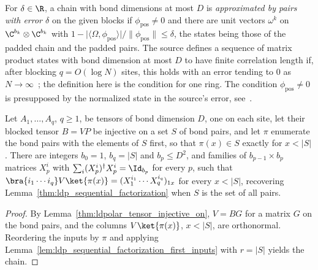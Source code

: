 \begin{definition}
    \label{def:ldp_pair_approximable}
    \leanok
    For $\delta\in\R$, a chain with bond dimensions at most $D$ is
    \emph{approximated by pairs with error $\delta$} on the given blocks if
    $\phi_{\mathrm{pos}}\neq0$ and there are unit vectors $\omega^k$ on
    $\C^{b_k}\otimes\C^{b_k}$ with
    $1-\lvert\langle\Omega,\phi_{\mathrm{pos}}\rangle\rvert
        /\lVert\phi_{\mathrm{pos}}\rVert\le\delta$, the states being those of
    the padded chain and the padded pairs. The source defines a sequence of
    matrix product states with bond dimension at most $D$ to have finite
    correlation length if, after blocking $q=O(\log N)$ sites, this holds with
    an error tending to $0$ as $N\to\infty$~\cite[paragraph ``Inhomogeneous
        short-range correlated MPS'']{Malz2024Preparation}; the definition here
    is the condition for one ring. The condition $\phi_{\mathrm{pos}}\neq0$ is
    presupposed by the normalized state in the source's error,
    see~\cite{gap:mswc24_inhomogeneous_scope}.
\end{definition}

\begin{lemma}
    \label{thm:ldp_sequential_factorization_on}
    \leanok
    Let $A_1,\dots,A_q$, $q\ge1$, be tensors of bond dimension $D$, one on each
    site, let their blocked tensor $B=VP$ be injective on a set $S$ of bond
    pairs, and let $\pi$ enumerate the bond pairs with the elements of $S$
    first, so that $\pi(x)\in S$ exactly for $x<\lvert S\rvert$. There are
    integers $b_0=1$, $b_q=\lvert S\rvert$ and $b_p\le D^2$, and families of
    $b_{p-1}\times b_p$ matrices $X_p^i$ with $\sum_i(X_p^i)^\dagger X_p^i=\Id_{b_p}$
    for every $p$, such that
    $\bra{i_1\cdots i_q}V\ket{\pi(x)}=(X_1^{i_1}\cdots X_q^{i_q})_{1x}$ for every
    $x<\lvert S\rvert$, recovering Lemma~\ref{thm:ldp_sequential_factorization}
    when $S$ is the set of all pairs.
\end{lemma}
\begin{proof}
    \leanok
    By Lemma~\ref{thm:ldpolar_tensor_injective_on}, $V=BG$ for a matrix $G$
    on the bond pairs, and the columns $V\ket{\pi(x)}$, $x<\lvert S\rvert$, are
    orthonormal. Reordering the inputs by $\pi$ and applying
    Lemma~\ref{lem:ldp_sequential_factorization_first_inputs} with
    $r=\lvert S\rvert$ yields the chain.
\end{proof}

